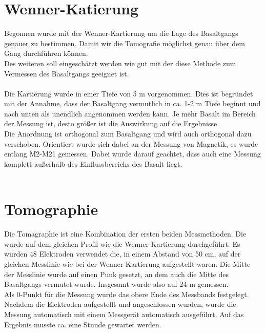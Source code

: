 \section{Wenner-Katierung}
Begonnen wurde mit der Wenner-Kartierung um die Lage des Basaltgangs genauer zu bestimmen. Damit wir die Tomografie möglichst genau über dem Gang durchführen
können. \\
Des weiteren soll eingeschätzt werden wie gut mit der diese Methode zum Vermessen des Basaltgangs geeignet ist.\\
\\
Die Kartierung wurde in einer Tiefe von 5 m vorgenommen. Dies ist begründet mit der Annahme, dass der Basaltgang vermutlich in ca. 1-2 m Tiefe beginnt und nach unten 
als unendlich angenommen werden kann. Je mehr Basalt im Bereich der Messung ist, desto größer ist die Auswirkung auf die Ergebnisse.\\
Die Anordnung ist orthogonal zum Basaltgang und wird auch orthogonal dazu verschoben. Orientiert wurde sich dabei an der Messung von Magnetik, es wurde 
entlang M2-M21 gemessen. Dabei wurde darauf geachtet, dass auch eine Messung komplett außerhalb 
des Einflussbereichs des Basalt liegt.\\
\\


 

\section{Tomographie}
Die Tomagraphie ist eine Kombination der ersten beiden Messmethoden. Die wurde auf dem gleichen Profil wie die Wenner-Kartierung durchgeführt.
Es wurden 48 Elektroden verwendet die, in einem Abstand von 50 cm, auf der gleichen Messlinie wie bei der Wenner-Kartierung aufgestellt waren. 
Die Mitte der Messlinie wurde auf einen Punk gesetzt, an dem auch die Mitte des Basaltgangs vermutet wurde. Insgesamt wurde also auf 24 m gemessen.\\
Als 0-Punkt für die Messung wurde das obere Ende des Messbands festgelegt.
Nachdem die Elektroden aufgestellt und angeschlossen wurden, wurde die Messung automatisch mit einem Messgerät automatisch ausgeführt. Auf das Ergebnis musste ca. 
eine Stunde gewartet werden.


